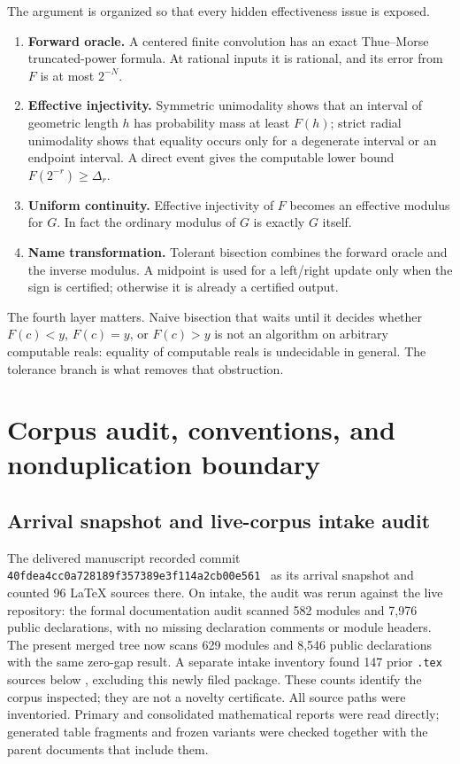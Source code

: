 \documentclass[11pt,oneside]{article}
\theoremstyle{definition}
\theoremstyle{remark}
\numberwithin{equation}{section}
\newcommand{\arrivalcommit}{\nolinkurl{40fdea4cc0a728189f357389e3f114a2cb00e561}}
\begin{document}
The argument is organized so that every hidden effectiveness issue is exposed.

\begin{enumerate}
\item \textbf{Forward oracle.}  A centered finite convolution has an exact
Thue--Morse truncated-power formula.  At rational inputs it is rational, and
its error from $F$ is at most $2^{-N}$.
\item \textbf{Effective injectivity.}  Symmetric unimodality shows that an
interval of geometric length $h$ has probability mass at least $F(h)$;
strict radial unimodality shows that equality occurs only for a degenerate
interval or an endpoint interval.
A direct event gives the computable lower bound $F(2^{-r})\ge\Delta_r$.
\item \textbf{Uniform continuity.}  Effective injectivity of $F$ becomes an
effective modulus for $G$.  In fact the ordinary modulus of $G$ is exactly
$G$ itself.
\item \textbf{Name transformation.}  Tolerant bisection combines the forward
oracle and the inverse modulus.  A midpoint is used for a left/right update
only when the sign is certified; otherwise it is already a certified output.
\end{enumerate}

The fourth layer matters.  Naive bisection that waits until it decides whether
$F(c)<y$, $F(c)=y$, or $F(c)>y$ is not an algorithm on arbitrary computable
reals: equality of computable reals is undecidable in general.  The tolerance
branch is what removes that obstruction.

\section{Corpus audit, conventions, and nonduplication boundary}

\subsection{Arrival snapshot and live-corpus intake audit}

The delivered manuscript recorded commit \arrivalcommit\ \cite{ProveIt} as its
arrival snapshot and counted 96 LaTeX sources there.  On intake, the audit was
rerun against the live repository: the formal documentation audit scanned 582
modules and 7,976 public declarations, with no missing declaration comments or
module headers.  The present merged tree now scans 629 modules and 8,546
public declarations with the same zero-gap result.  A separate intake
inventory found 147 prior \texttt{.tex}
sources below , excluding this newly filed
package.  These counts identify the corpus inspected; they are not a novelty
certificate.  All source paths were inventoried.  Primary and consolidated
mathematical reports were read directly; generated table fragments and frozen
variants were checked together with the parent documents that include them.
\end{document}
